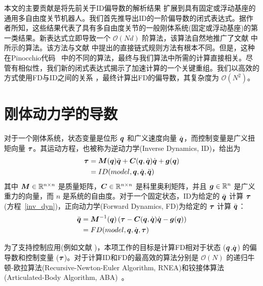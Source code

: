 \documentclass[letterpaper, 10 pt, conference]{ieeetran}  %
\begin{document}
本文的主要贡献是将先前关于ID偏导数的解析结果 \cite{jain} 扩展到具有固定或浮动基座的通用多自由度关节机器人。我们首先推导出ID的一阶偏导数的闭式表达式。据作者所知，这些结果代表了具有多自由度关节的一般刚体系统(固定或浮动基座)的第一类结果。新表达式立即导致一个 $\mathcal{O}(Nd)$ 阶算法，该算法自然地推广了文献 \cite{jain} 中所示的算法。该方法与文献 \cite{car} 中提出的直接链式规则方法有根本不同。但是，这种在Pinocchio代码~\cite{car_code} 中的不同的算法，最终与我们算法中所需的计算直接相关。尽管有相似性，我们新的闭式表达式揭示了加速计算的一个关键重组。我们以高效的方式使用FD与ID之间的关系 \cite{car,jain}，最终计算出FD的偏导数，其复杂度为 $\mathcal{O}(N^2)$。

\section{刚体动力学的导数}
\label{sec:pd_rbd}


 对于一个刚体系统，状态变量是位形 $\boldsymbol{q}$ 和广义速度向量 $\dot{\boldsymbol{q}}$，而控制变量是广义扭矩向量 $\boldsymbol{\tau}$。其运动方程，也被称为逆动力学(Inverse Dynamics, ID)，给出为
\begin{align}
    \taubar &= \M(\q)\qdd+ \C(\q,\qd)\qd + \g(\q)
    \label{inv_dyn} \\
&= ID(model,\q,  \qd, \qdd)
    \label{inv_dyn_model}
\end{align}
其中 $\boldsymbol{M} \in \mathbb{R}^{n \times n}$ 是质量矩阵，$\boldsymbol{C} \in \mathbb{R}^{n \times n}$ 是科里奥利矩阵，并且 $\boldsymbol{g} \in \mathbb{R}^{n}$ 是广义重力的向量，而 $n$ 是系统的自由度。对于一个固定状态，ID为给定的 $\ddot{\boldsymbol{q}}$ 计算 $\boldsymbol{\tau}$ (方程~\ref{inv_dyn})，正向动力学(Forward Dynamics, FD)为给定的 $\boldsymbol{\tau}$ 计算 $\ddot{\boldsymbol{q}}$：
\begin{align}
    \qdd &= \M^{-1}(\q)\left( \taubar -  \C(\q,\qd)\qd - \g(\q) \right)
    \label{fwd_dyn2} \\
    &= FD(model,\q, \qd, \taubar)
    \label{for_dyn_model}
\end{align}

为了支持控制应用(例如文献 )，本项工作的目标是计算FD相对于状态 ($\boldsymbol{q}$,$\dot{\boldsymbol{q}}$) 的偏导数和控制变量 ($\boldsymbol{\tau}$)。对于计算ID和FD的最高效的算法分别是 $\mathcal{O}(N)$ 的递归牛顿-欧拉算法(Recursive-Newton-Euler Algorithm, RNEA)和铰接体算法(Articulated-Body Algorithm, ABA)~\cite{rbd}。
\end{document}
